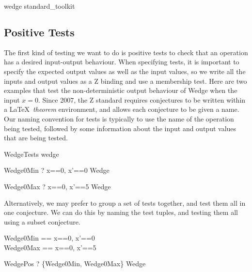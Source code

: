 \documentclass{llncs}
\begin{document}
\begin{zsection}
  \SECTION wedge \parents standard\_toolkit
\end{zsection}

\subsection{Positive Tests}

The first kind of testing we want to do is positive tests to check that an
operation has a desired input-output behaviour.  When specifying
tests, it is important to specify the expected output values as well as the
input values, so we write all the inputs and output values as a Z binding
and use a membership test.  Here are two examples that test the
non-deterministic output behaviour of Wedge when the input $x=0$.
Since 2007, the Z standard requires conjectures to be written within
a \LaTeX\ \emph{theorem} environment, and allows each conjecture to be
given a name.  Our naming convention for tests is typically to use the name
of the operation being tested, followed by some information about the input
and output values that are being tested.

\begin{zsection}
  \SECTION WedgeTests \parents wedge
\end{zsection}

\begin{theorem}{Wedge0Min}
\vdash? \quad \lblot x==0, x'==0 \rblot \in Wedge
\end{theorem}

\begin{theorem}{Wedge0Max}
\vdash? \quad \lblot x==0, x'==5 \rblot \in Wedge
\end{theorem}

Alternatively, we may prefer to group a set of tests together, and test
them all in one conjecture.  We can do this by naming the test tuples, and
testing them all using a subset conjecture.

\begin{zed}
  Wedge0Min == \lblot x==0, x'==0 \rblot \\
  Wedge0Max == \lblot x==0, x'==5 \rblot
\end{zed}

\begin{theorem}{WedgePos}
  \vdash? \quad \{Wedge0Min, Wedge0Max\} \subseteq Wedge
\end{theorem}
\end{document}
